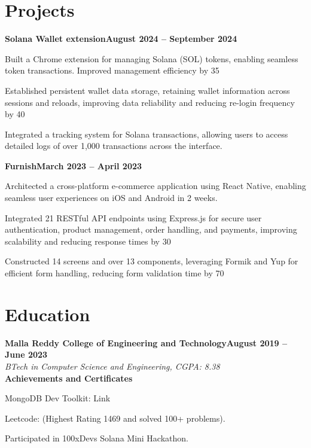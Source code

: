 \documentclass[letterpaper,10pt]{article}
\newcommand{\heading}[2]{
  \hspace{10pt}#1\hfill#2\\
}
\newcommand{\headingBf}[2]{
  \heading{\textbf{#1}}{\textbf{#2}}
}
\newcommand{\headingIt}[2]{
  \heading{\textit{#1}}{\textit{#2}}
}
\newenvironment{resume_list}{
  \vspace{-7pt}
  \begin{itemize}[itemsep=-2px, parsep=1pt, leftmargin=30pt]
}{
  \end{itemize}
}
\begin{document}
  \section{Projects}
  \headingBf{Solana Wallet extension}{August 2024 -- September 2024}
  \begin{resume_list}
    \item Built a Chrome extension for managing Solana (SOL) tokens, enabling seamless token transactions. Improved management efficiency by 35
    \item Established persistent wallet data storage, retaining wallet information across sessions and reloads, improving data reliability and reducing re-login frequency by 40
    \item Integrated a tracking system for Solana transactions, allowing users to access detailed logs of over 1,000 transactions across the interface.
  \end{resume_list}
  \headingBf{Furnish}{March 2023 -- April 2023}
  \begin{resume_list}
    \item Architected a cross-platform e-commerce application using React Native, enabling seamless user experiences on iOS and Android in 2 weeks.
    \item Integrated 21 RESTful API endpoints using Express.js for secure user authentication, product management, order handling, and payments, improving scalability and reducing response times by 30
    \item Constructed 14 screens and over 13 components, leveraging Formik and Yup for efficient form handling, reducing form validation time by 70
  \end{resume_list}
  \section{Education}
  \headingBf{Malla Reddy College of Engineering and Technology}{August 2019 -- June 2023}
  \headingIt{BTech in Computer Science and Engineering, CGPA: 8.38}{}
  \headingBf{Achievements and Certificates}{}
  \begin{resume_list}
    \item MongoDB Dev Toolkit: Link
    \item Leetcode: (Highest Rating 1469 and solved 100+ problems).
    \item Participated in 100xDevs Solana Mini Hackathon.
  \end{resume_list}
\end{document}
